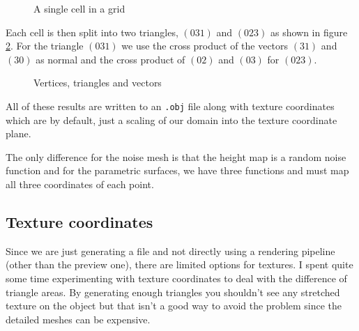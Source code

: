 \documentclass{acmsiggraph}
\begin{document}
\begin{figure}[ht]
  \centering
  \caption{A single cell in a grid}
  \label{fig:cell}
\end{figure}

Each cell is then split into two triangles, $(031)$ and $(023)$ as shown in figure \ref{fig:tri}. For the triangle $(031)$ we use the cross product of the vectors $(31)$ and $(30)$ as normal and the cross product of $(02)$ and $(03)$ for $(023)$.

\begin{figure}[ht]
  \centering
  \caption{Vertices, triangles and vectors}
  \label{fig:tri}
\end{figure}

All of these results are written to an \texttt{.obj} file along with texture coordinates which are by default, just a scaling of our domain into the texture coordinate plane. 

The only difference for the noise mesh is that the height map is a random noise function and for the parametric surfaces, we have three functions and must map all three coordinates of each point.

\subsection{Texture coordinates}
Since we are just generating a file and not directly using a rendering pipeline (other than the preview one), there are limited options for textures. I spent quite some time experimenting with texture coordinates to deal with the difference of triangle areas. By generating enough triangles you shouldn't see any stretched texture on the object but that isn't a good way to avoid the problem since the detailed meshes can be expensive.
\end{document}
